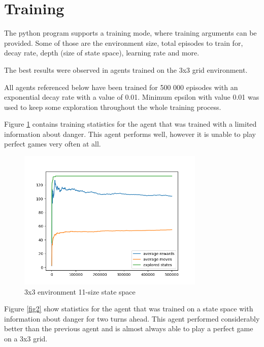 \documentclass[lettersize,journal]{IEEEtran}
\begin{document}
\section{Training} \label{training}
The python program supports a training mode, where
training arguments can be provided. Some of those are the environment size,
total episodes to train for, decay rate, depth (size of state space),
learning rate and more.

The best results were observed in agents trained on the 3x3 grid environment.

All agents referenced below have been trained for 500 000 episodes
with an exponential decay rate with a value of 0.01. Minimum epsilon with value 0.01
was used to keep some exploration throughout the whole training
process.

Figure \ref{fig1} contains training statistics for the agent that was trained
with a limited information about danger. This agent performs well, however
it is unable to play perfect games very often at all.


\begin{figure}[!t]
\centering
\includegraphics[width=3.5in]{3_fig.png}
\caption{3x3 environment 11-size state space}
\label{fig1}
\end{figure}

Figure \ref{fig2} show statistics for the agent that was trained on a
state space with information about danger for two turns ahead.
This agent performed considerably better than the previous agent and
is almost always able to play a perfect game on a 3x3 grid.
\end{document}
